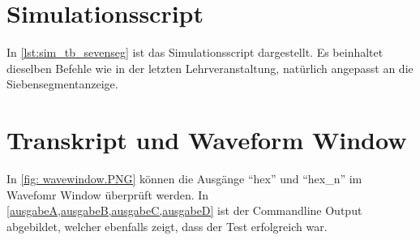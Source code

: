 \documentclass[./\jobname.tex]{subfiles}
\begin{document}
\section{Simulationsscript}
%
In \autoref{lst:sim_tb_sevenseg} ist das Simulationsscript dargestellt. Es beinhaltet dieselben Befehle wie in der letzten Lehrveranstaltung, natürlich angepasst an die Siebensegmentanzeige.
%

%
\section{Transkript und Waveform Window}
%
In \autoref{fig: wavewindow.PNG} können die Ausgänge \enquote{hex} und \enquote{hex\_n} im Wavefomr Window überprüft werden. In \cref{ausgabeA,ausgabeB,ausgabeC,ausgabeD} ist der Commandline Output abgebildet, welcher ebenfalls zeigt, dass der Test erfolgreich war. 
%
\begin{figure}[H]
	\centering
	\noindent{}
	\label{fig: wavewindow.PNG}
\end{figure}
%
\newpage
%
\setcounter{listingCtrBegin}{35}
\setcounter{listingCtrEnd}{93}
%
\begin{multicols}{2}\raggedcolumns
	 	
		\addtocounter{listingCtrBegin}{60}
		\addtocounter{listingCtrEnd}{60}
		
%
%
%
\end{multicols}
%
\newpage
%
%
\begin{multicols}{2}
		\addtocounter{listingCtrBegin}{60}
\addtocounter{listingCtrEnd}{60}

%
		\addtocounter{listingCtrBegin}{60}
\addtocounter{listingCtrEnd}{60}

\end{multicols}
%
\end{document}
